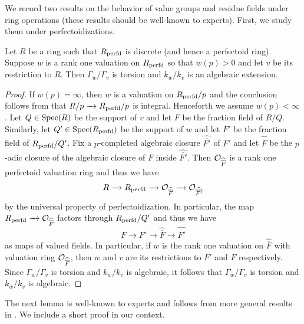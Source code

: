 \documentclass[12pt]{amsart}
\numberwithin{equation}{theorem}
\numberwithin{equation}{theorem}
\newcommand{\perfd}{\textnormal{perfd}}
\begin{document}
We record two results on the behavior of value groups and residue fields under ring operations (these results should be well-known to experts). First, we study them under perfectoidizations.

\begin{lemma}
\label{lem: extend valuation perfectoidization}
Let $R$ be a ring such that $R_\perfd$ is discrete (and hence a perfectoid ring). Suppose $w$ is a rank one valuation on $R_\perfd$ so that $w(p)> 0$ and let $v$ be its restriction to $R$. Then $\Gamma_w/\Gamma_v$ is torsion and $k_w/k_v$ is an algebraic extension.  
\end{lemma}
\begin{proof}
If $w(p)=\infty$, then $w$ is a valuation on $R_\perfd/p$ and the conclusion follows from that $R/p\to R_\perfd/p$ is integral. Henceforth we assume $w(p)<\infty$. Let $Q\in\operatorname{{Spec}}(R)$ be the support of $v$ and let $F$ be the fraction field of $R/Q$. Similarly, let $Q'\in\Spec(R_\perfd)$ be the support of $w$ and let $F'$ be the fraction field of $R_\perfd/Q'$. Fix a $p$-completed algebraic closure $\widehat{\overline{F'}}$ of $F'$ and let $\widehat{\overline{F}}$ be the $p$-adic closure of the algebraic closure of $F$ inside $\widehat{\overline{F'}}$. Then $\mathcal O_{\widehat{\overline{F}}}$ is a rank one perfectoid valuation ring and thus we have 
$$R\to R_\perfd\to \sO_{\widehat{\overline{F}}}\to \sO_{\widehat{\overline{F'}}}$$ by the universal property of perfectoidization. In particular, the map $R_\perfd\to \sO_{\widehat{\overline{F}}}$ factors through $R_\perfd/Q'$ and thus we have 
$$F\to F'\to \widehat{\overline{F}} \to \widehat{\overline{F'}}$$
as maps of valued fields. In particular, if $\overline{w}$ is the rank one valuation on $\widehat{\overline{F}}$ with valuation ring $\mathcal O_{\widehat{\overline{F}}}$, then $w$ and $v$ are its restrictions to $F'$ and $F$ respectively. Since $\Gamma_{\overline{w}}/\Gamma_v$ is torsion and $k_{\overline{w}}/k_v$ is algebraic, it follows that $\Gamma_{w}/\Gamma_v$ is torsion and $k_{w}/k_v$ is algebraic. 
\end{proof}

The next lemma is well-known to experts and follows from more general results in \cite[Corollary 8.19]{KedlayaWittVectors2013}. We include a short proof in our context.
\end{document}
